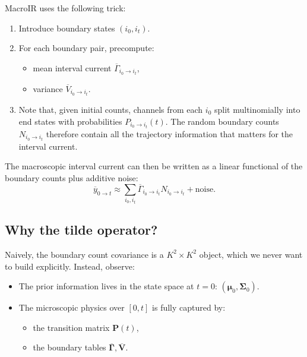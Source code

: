 \documentclass[11pt]{article}
\begin{document}
MacroIR uses the following trick:
\begin{enumerate}
  \item Introduce boundary states \((i_0,i_t)\).
  \item For each boundary pair, precompute:
    \begin{itemize}
      \item mean interval current \(\overline{\Gamma}_{i_0\to i_t}\),
      \item variance \(\overline{V}_{i_0\to i_t}\).
    \end{itemize}
  \item Note that, given initial counts, channels from each \(i_0\) split multinomially into end states with probabilities \(P_{i_0\to i_t}(t)\). The random boundary counts \(N_{i_0\to i_t}\) therefore contain all the trajectory information that matters for the interval current.
\end{enumerate}

The macroscopic interval current can then be written as a linear functional of the boundary counts plus additive noise:
\[
  \overline{y}_{0\to t}
  \approx
  \sum_{i_0,i_t}
  \overline{\Gamma}_{i_0\to i_t}N_{i_0\to i_t}
  +
  \text{noise}.
\]

\subsection{Why the tilde operator?}

Naively, the boundary count covariance is a \(K^2\times K^2\) object, which we never want to build explicitly. Instead, observe:
\begin{itemize}
  \item The prior information lives in the state space at \(t=0\): \((\boldsymbol{\mu}_0,\boldsymbol{\Sigma}_0)\).
  \item The microscopic physics over \([0,t]\) is fully captured by:
    \begin{itemize}
      \item the transition matrix \(\mathbf{P}(t)\),
      \item the boundary tables \(\overline{\mathbf{\Gamma}},\overline{\mathbf{V}}\).
    \end{itemize}
\end{itemize}
\end{document}
